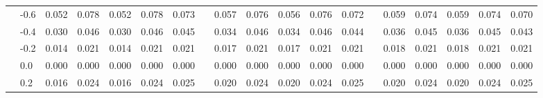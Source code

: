 \begin{table}
{\begin{tabular}{llccccccccccccccccc}
 & -0.6 & \cellcolor[HTML]{ECF7E4}0.052 & \cellcolor[HTML]{FCFEC6}0.078 & \cellcolor[HTML]{ECF7E4}0.052 & \cellcolor[HTML]{FCFEC6}0.078 & \cellcolor[HTML]{FAFCCB}0.073 & & \cellcolor[HTML]{EFF8E0}0.057 & \cellcolor[HTML]{FAFDCA}0.076 & \cellcolor[HTML]{EFF8E0}0.056 & \cellcolor[HTML]{FAFDCA}0.076 & \cellcolor[HTML]{F8FCCF}0.072 & & \cellcolor[HTML]{F0F8DE}0.059 & \cellcolor[HTML]{F9FCCD}0.074 & \cellcolor[HTML]{F0F8DE}0.059 & \cellcolor[HTML]{F9FCCD}0.074 & \cellcolor[HTML]{F7FBD1}0.070 \\
 & -0.4 & \cellcolor[HTML]{D1EBF4}0.030 & \cellcolor[HTML]{E8F5EC}0.046 & \cellcolor[HTML]{D1EBF4}0.030 & \cellcolor[HTML]{E8F5EC}0.046 & \cellcolor[HTML]{E6F5EE}0.045 & & \cellcolor[HTML]{D7EEF5}0.034 & \cellcolor[HTML]{E6F5EF}0.046 & \cellcolor[HTML]{D7EEF5}0.034 & \cellcolor[HTML]{E6F5EF}0.046 & \cellcolor[HTML]{E5F4F1}0.044 & & \cellcolor[HTML]{DAF0F6}0.036 & \cellcolor[HTML]{E5F5F1}0.045 & \cellcolor[HTML]{DAF0F6}0.036 & \cellcolor[HTML]{E5F5F1}0.045 & \cellcolor[HTML]{E4F4F3}0.043 \\
 & -0.2 & \cellcolor[HTML]{ACDAE9}0.014 & \cellcolor[HTML]{BFE3EF}0.021 & \cellcolor[HTML]{ACDAE9}0.014 & \cellcolor[HTML]{BFE3EF}0.021 & \cellcolor[HTML]{BFE3EF}0.021 & & \cellcolor[HTML]{B3DDEB}0.017 & \cellcolor[HTML]{BEE2EE}0.021 & \cellcolor[HTML]{B3DDEB}0.017 & \cellcolor[HTML]{BEE2EE}0.021 & \cellcolor[HTML]{BEE2EE}0.021 & & \cellcolor[HTML]{B5DEEC}0.018 & \cellcolor[HTML]{BDE2EE}0.021 & \cellcolor[HTML]{B5DEEC}0.018 & \cellcolor[HTML]{BDE2EE}0.021 & \cellcolor[HTML]{BDE2EE}0.021 \\
 & 0.0 & \cellcolor[HTML]{74ADD1}0.000 & \cellcolor[HTML]{74ADD1}0.000 & \cellcolor[HTML]{74ADD1}0.000 & \cellcolor[HTML]{74ADD1}0.000 & \cellcolor[HTML]{74ADD1}0.000 & & \cellcolor[HTML]{74ADD1}0.000 & \cellcolor[HTML]{74ADD1}0.000 & \cellcolor[HTML]{74ADD1}0.000 & \cellcolor[HTML]{74ADD1}0.000 & \cellcolor[HTML]{74ADD1}0.000 & & \cellcolor[HTML]{74ADD1}0.000 & \cellcolor[HTML]{74ADD1}0.000 & \cellcolor[HTML]{74ADD1}0.000 & \cellcolor[HTML]{74ADD1}0.000 & \cellcolor[HTML]{74ADD1}0.000 \\
 & 0.2 & \cellcolor[HTML]{B2DDEB}0.016 & \cellcolor[HTML]{C5E5F0}0.024 & \cellcolor[HTML]{B2DDEB}0.016 & \cellcolor[HTML]{C5E5F0}0.024 & \cellcolor[HTML]{C7E7F1}0.025 & & \cellcolor[HTML]{BAE0ED}0.020 & \cellcolor[HTML]{C5E5F0}0.024 & \cellcolor[HTML]{BAE0ED}0.020 & \cellcolor[HTML]{C5E5F0}0.024 & \cellcolor[HTML]{C6E6F1}0.025 & & \cellcolor[HTML]{BBE1ED}0.020 & \cellcolor[HTML]{C5E5F0}0.024 & \cellcolor[HTML]{BBE1ED}0.020 & \cellcolor[HTML]{C5E5F0}0.024 & \cellcolor[HTML]{C6E6F0}0.025 \\

\end{tabular}}
\end{table}
